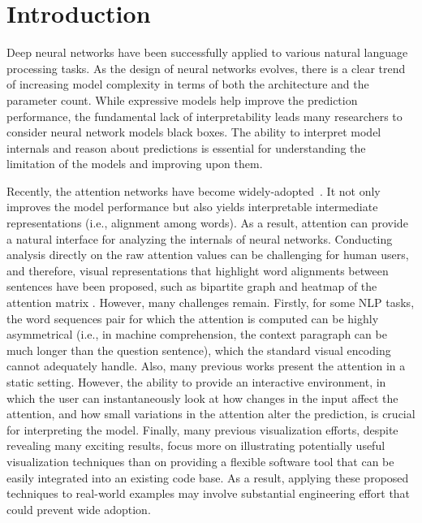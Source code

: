 \section{Introduction}

Deep neural networks have been successfully applied to various natural language processing tasks.
As the design of neural networks evolves, there is a clear trend of increasing model complexity in terms of both the architecture and the parameter count. 
%
While expressive models help improve the prediction performance, the fundamental lack of interpretability leads many researchers to consider neural network models black boxes. 
%
The ability to interpret model internals and reason about predictions is essential for understanding the limitation of the models and improving upon them.


Recently, the attention networks have become  widely-adopted~\cite{bahdanau2014neural,seo2016bidirectional,Parikh2016, VaswaniShazeerParmar2017}. It not only improves the model performance but also yields interpretable intermediate representations (i.e., alignment among words). As a result, attention can provide a natural interface for analyzing the internals of neural networks. Conducting analysis directly on the raw attention values can be challenging for human users, and therefore, visual representations that highlight word alignments between sentences have been proposed, such as bipartite graph and heatmap of the attention matrix \cite{LiChenHovy2015, li2016understanding, lee2017interactive}.  However, many challenges remain. Firstly, for some NLP tasks, the word sequences pair for which the attention is computed can be highly asymmetrical (i.e., in machine comprehension, the context paragraph can be much longer than the question sentence), which the standard visual encoding cannot adequately handle.  Also, many previous works present the attention in a static setting. However, the ability to provide an interactive environment, in which the user can instantaneously look at how changes in the input affect the attention, and how small variations in the attention alter the prediction, is crucial for interpreting the model. Finally, many previous visualization efforts, despite revealing many exciting results, focus more on illustrating potentially useful visualization techniques than on providing a flexible software tool that can be easily integrated into an existing code base. As a result, applying these proposed techniques to real-world examples may involve substantial engineering effort that could prevent wide adoption.

